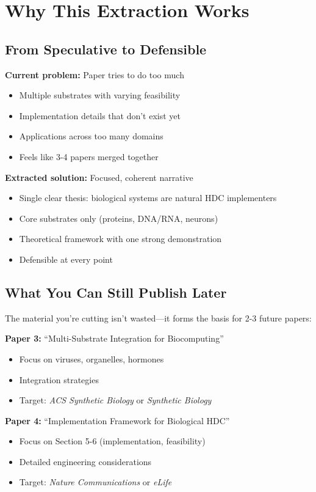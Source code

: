 \documentclass[11pt]{article}
\begin{document}
\section{Why This Extraction Works}

\subsection{From Speculative to Defensible}

\textbf{Current problem:} Paper tries to do too much
\begin{itemize}
    \item Multiple substrates with varying feasibility
    \item Implementation details that don't exist yet
    \item Applications across too many domains
    \item Feels like 3-4 papers merged together
\end{itemize}

\textbf{Extracted solution:} Focused, coherent narrative
\begin{itemize}
    \item Single clear thesis: biological systems are natural HDC implementers
    \item Core substrates only (proteins, DNA/RNA, neurons)
    \item Theoretical framework with one strong demonstration
    \item Defensible at every point
\end{itemize}

\subsection{What You Can Still Publish Later}

The material you're cutting isn't wasted—it forms the basis for 2-3 future papers:

\textbf{Paper 3:} ``Multi-Substrate Integration for Biocomputing''
\begin{itemize}
    \item Focus on viruses, organelles, hormones
    \item Integration strategies
    \item Target: \textit{ACS Synthetic Biology} or \textit{Synthetic Biology}
\end{itemize}

\textbf{Paper 4:} ``Implementation Framework for Biological HDC''
\begin{itemize}
    \item Focus on Section 5-6 (implementation, feasibility)
    \item Detailed engineering considerations
    \item Target: \textit{Nature Communications} or \textit{eLife}
\end{itemize}
\end{document}
